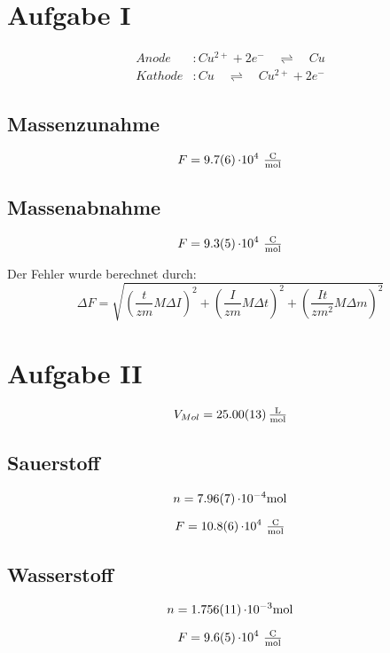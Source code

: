 \section{Aufgabe I}


\begin{align}
    Anode&:Cu^{2+} + 2e^- \quad\rightleftharpoons  \quad Cu\\
    Kathode &: Cu \quad\rightleftharpoons  \quad Cu^{2+} + 2e^-
\end{align}

\subsection{Massenzunahme}


\[F = \SI{9,7\pm 0,6}{\cdot 10^{4}\ \tfrac{\coulomb}{\mole}}\]

\subsection{Massenabnahme}

\[F = \SI{9,3\pm 0,5}{\cdot 10^{4}\ \tfrac{\coulomb}{\mole}}\]

Der Fehler wurde berechnet durch:
\begin{equation}
    \Delta F = \sqrt{\left(\frac{t}{zm} M \Delta I\right)^2 + \left(\frac{I}{zm} M \Delta t\right)^2 + \left(\frac{It }{z m^2} M\Delta m\right)^2}
\end{equation}

\section{Aufgabe II}

\[V_{Mol} = \SI{25,00 \pm 0.13}{\tfrac{\litre}{\mole}}\]


\subsection{Sauerstoff}

\[n = \SI{7,96 \pm 0,07}{\cdot 10 ^{-4}\mole}\]

\[F = \SI{10,8\pm 0,6}{\cdot 10^{4}\ \tfrac{\coulomb}{\mole}}\]


\subsection{Wasserstoff}

\[n = \SI{1,756 \pm 0,011}{\cdot 10 ^{-3}\mole}\]

\[F = \SI{9,6\pm 0,5}{\cdot 10^{4}\ \tfrac{\coulomb}{\mole}}\]
